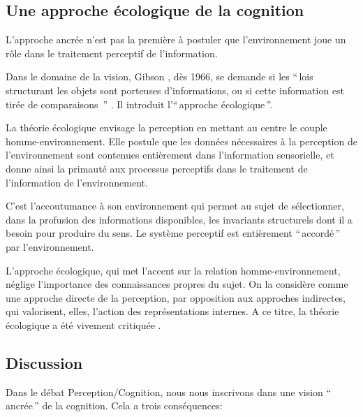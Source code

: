 \subsection{Une approche écologique de la cognition}
\label{sec:ch3_ecologiqueCognition}

L'approche ancrée n'est pas la première à postuler que l'environnement joue un rôle dans le traitement perceptif de l'information.

Dans le domaine de la vision, Gibson \citep{gibson1966senses}, dès 1966, se demande si les ``\,lois structurant les objets sont porteuses d'informations, ou si cette information est tirée de comparaisons \,'' \citep{gibson1978ecological}. Il introduit l'``\,approche écologique\,''. 

La théorie écologique envisage la perception en mettant au centre le couple homme-environnement. Elle postule que les données nécessaires à la perception de l'environnement sont contenues entièrement dans l'information sensorielle, et donne ainsi la primauté aux processus perceptifs dans le traitement de l'information de l'environnement.

C'est l'accoutumance à son environnement qui permet au sujet de sélectionner, dans la profusion des informations disponibles, les invariants structurels dont il a besoin pour produire du sens. Le système perceptif est entièrement ``\,accordé\,'' par l'environnement.

L'approche écologique, qui met l'accent sur la relation homme-environnement, néglige l'importance des connaissances propres du sujet. On la considère comme une approche directe de la perception, par opposition aux approches indirectes, qui valorisent, elles, l'action des représentations internes. A ce titre, la théorie écologique a été vivement critiquée \citep{ullman1980against}.

\subsection{Discussion}

Dans le débat Perception/Cognition, nous nous inscrivons dans une vision ``\,ancrée\,'' de la cognition. Cela a trois conséquences:

